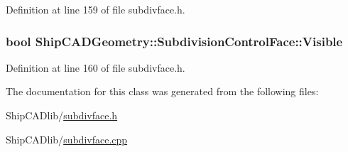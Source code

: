Definition at line 159 of file subdivface.\-h.

\hypertarget{classShipCADGeometry_1_1SubdivisionControlFace_a49356a1146c3fc1220302deffbc20250}{
\subsubsection[{Visible}]{\setlength{\rightskip}{0pt plus 5cm}bool Ship\-C\-A\-D\-Geometry\-::\-Subdivision\-Control\-Face\-::\-Visible\hspace{0.3cm}{\ttfamily [read]}}}\label{classShipCADGeometry_1_1SubdivisionControlFace_a49356a1146c3fc1220302deffbc20250}


Definition at line 160 of file subdivface.\-h.



The documentation for this class was generated from the following files\-:\begin{DoxyCompactItemize}
\item 
Ship\-C\-A\-Dlib/\hyperlink{subdivface_8h}{subdivface.\-h}\item 
Ship\-C\-A\-Dlib/\hyperlink{subdivface_8cpp}{subdivface.\-cpp}\end{DoxyCompactItemize}
